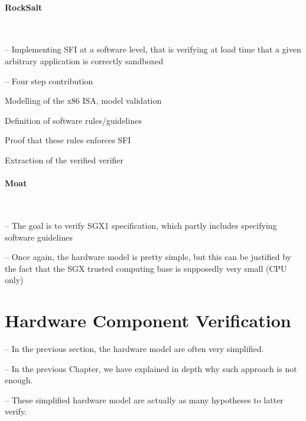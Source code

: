 \paragraph{RockSalt}\,\cite{morrisett2012rocksalt}
%
\begin{compactitem}
\item[--] Implementing SFI at a software level, that is verifying at load time
  that a given arbitrary application is correctly sandboxed
\item[--] Four step contribution
  \begin{compactenum}
  \item Modelling of the x86 ISA, model validation
  \item Definition of software rules/guidelines
  \item Proof that these rules enforces SFI
  \item Extraction of the verified verifier
  \end{compactenum}
\end{compactitem}

\paragraph{Moat}\,\cite{sinha2015moat}
%
\begin{compactitem}
\item[--] The goal is to verify SGX1 specification, which partly includes
  specifying software guidelines
\item[--] Once again, the hardware model is pretty simple, but this can be
  justified by the fact that the SGX trusted computing base is supposedly very
  small (CPU only)
\end{compactitem}

\section{Hardware Component Verification} %
\label{sec:relatedwork:hardware}

\begin{compactitem}
\item[--] In the previous section, the hardware model are often very simplified.
\item[--] In the previous Chapter, we have explained in depth why such approach
  is not enough.
\item[--] These simplified hardware model are actually as many hypotheses to
  latter verify.
\end{compactitem}

